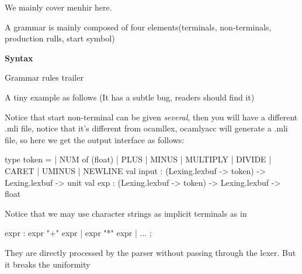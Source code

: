 
We mainly cover menhir here.

A grammar is mainly composed of four elements(terminals,
non-terminals, production rulls, start symbol)

\textbf{Syntax}


\begin{bluetext}
    Grammar rules 
    trailer 
\end{bluetext}


A tiny example as follows (It has a subtle bug, readers should find it)  

Notice that start non-terminal can be given \textit{several}, then you will
have a different .mli file, notice that it's different from ocamllex,
ocamlyacc will generate a .mli file, so here we get the output
interface as follows:

\begin{bluetext}
\end{bluetext}

\begin{ocamlcode}
type token =
  | NUM of (float)
  | PLUS
  | MINUS
  | MULTIPLY
  | DIVIDE
  | CARET
  | UMINUS
  | NEWLINE
val input :
  (Lexing.lexbuf  -> token) -> Lexing.lexbuf -> unit
val exp :
  (Lexing.lexbuf  -> token) -> Lexing.lexbuf -> float
\end{ocamlcode}

Notice that we may use character strings as implicit terminals as in 
\begin{ocamlcode}
expr : expr "+" expr {}
     | expr "*" expr {}
     | ... ;
\end{ocamlcode}
They are directly processed by the parser without passing through the
lexer. But it breaks the uniformity


